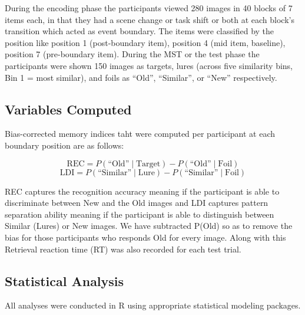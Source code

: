 \documentclass[
  12pt,
]{article}
\begin{document}
During the encoding phase the participants viewed 280 images in 40 blocks of 7 items each, in that they had a scene change or task shift or both at each block’s transition which acted as event boundary. The items were classified by the position like position 1 (post-boundary item), position 4 (mid item, baseline), position 7 (pre-boundary item). During the MST or the test phase the participants were shown 150 images as targets, lures (across five similarity bins, Bin 1 = most similar), and foils as ``Old'', ``Similar'', or ``New'' respectively.

\subsection{Variables Computed}

Bias-corrected memory indices taht were computed per participant at each boundary position are as follows:

\[
\text{REC} = P(\text{``Old''} \mid \text{Target}) - P(\text{``Old''} \mid \text{Foil})
\]
\[
\text{LDI} = P(\text{``Similar''} \mid \text{Lure}) - P(\text{``Similar''} \mid \text{Foil})
\]

REC captures the recognition accuracy meaning if the participant is able to discriminate between New and the Old images and LDI captures pattern separation ability meaning if the participant is able to distinguish between Similar (Lures) or New images. We have subtracted P(Old) so as to remove the bias for those participants who responds Old for every image. Along with this Retrieval reaction time (RT) was also recorded for each test trial.

\subsection{Statistical Analysis}

All analyses were conducted in R using appropriate statistical modeling packages.
\\\
\end{document}
